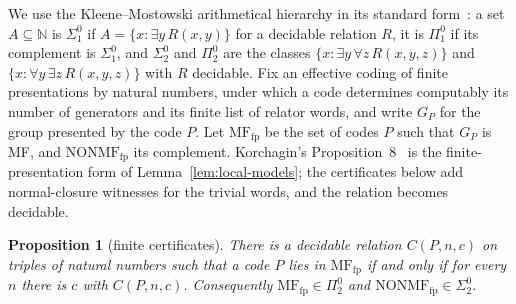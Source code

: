 \documentclass[11pt]{amsart}
\newtheorem{proposition}[theorem]{Proposition}
\theoremstyle{remark}
\theoremstyle{plain}
\begin{document}
We use the Kleene--Mostowski arithmetical hierarchy in its standard
form~\cite{Soare}: a set $A\subseteq\mathbb N$ is $\Sigma^0_1$ if
$A=\{x:\exists y\,R(x,y)\}$ for a decidable relation $R$, it is
$\Pi^0_1$ if its complement is $\Sigma^0_1$, and $\Sigma^0_2$ and
$\Pi^0_2$ are the classes $\{x:\exists y\,\forall z\,R(x,y,z)\}$ and
$\{x:\forall y\,\exists z\,R(x,y,z)\}$ with $R$ decidable.  Fix an
effective coding of finite presentations by natural numbers, under which a
code determines computably its number of generators and its finite list of
relator words, and write $G_P$ for the group presented by the code $P$.
Let $\mathrm{MF}_{\mathrm{fp}}$ be the set of codes $P$ such that $G_P$ is
MF, and $\mathrm{NONMF}_{\mathrm{fp}}$ its complement.  Korchagin's
Proposition~8~\cite{Korchagin} is the finite-presentation form of
Lemma~\ref{lem:local-models}; the certificates below add normal-closure
witnesses for the trivial words, and the relation becomes decidable.

\begin{proposition}[finite certificates]\label{prop:mf-upper-bound}
There is a decidable relation $C(P,n,c)$ on triples of natural numbers
such that a code $P$ lies in $\mathrm{MF}_{\mathrm{fp}}$ if and only if
for every $n$ there is $c$ with $C(P,n,c)$.  Consequently
$\mathrm{MF}_{\mathrm{fp}}\in\Pi^0_2$ and
$\mathrm{NONMF}_{\mathrm{fp}}\in\Sigma^0_2$.
\end{proposition}
\end{document}
